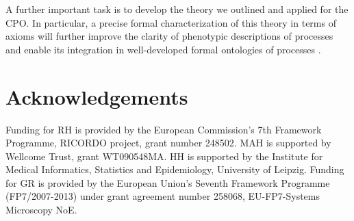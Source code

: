\documentclass[12pt]{article}
\renewcommand{\cite}{\citep}
\begin{document}
A further important task is to develop the theory we outlined and
applied for the CPO. In particular, a precise formal characterization
of this theory in terms of axioms will further improve the clarity of
phenotypic descriptions of processes and enable its integration in
well-developed formal ontologies of processes \cite{Herre2006,
  Gruninger2010}.

\section{Acknowledgements}
Funding for RH is provided by the European Commission's 7th Framework
Programme, RICORDO project, grant number 248502. MAH is supported by
Wellcome Trust, grant WT090548MA. HH is supported by the Institute for
Medical Informatics, Statistics and Epidemiology, University of
Leipzig.  Funding for GR is provided by the European Union's Seventh
Framework Programme (FP7/2007-2013) under grant agreement number
258068, EU-FP7-Systems Microscopy NoE. 


    




 
\end{document}
